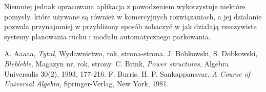 \documentclass[a4paper,11pt,twoside]{report}
\theoremstyle{definition}
\begin{document}
Niemniej jednak opracowana aplikacja z powodzeniem wykorzystuje niektóre pomysły, które używane są również w komercyjnych rozwiązaniach, a jej działanie pozwala przynajmniej w przybliżony sposób zobaczyć w jak działają rzeczywiste systemy planowania ruchu i modułu automatycznego parkowania.


\begin{thebibliography}{20}%

 A. Aaaaa, \emph{Tytuł}, Wydawnictwo, rok, strona-strona.
 J. Bobkowski, S. Dobkowski, \emph{Blebleble}, Magazyn nr, rok, strony.
 C. Brink, \emph{Power structures}, Algebra Universalis 30(2), 1993, 177-216.
 F. Burris, H. P. Sankappanavar, \emph{A Course of Universal Algebra}, Springer-Verlag, New York, 1981.
\end{thebibliography}
\thispagestyle{empty}





\listoffigures
\thispagestyle{empty}








\end{document}

